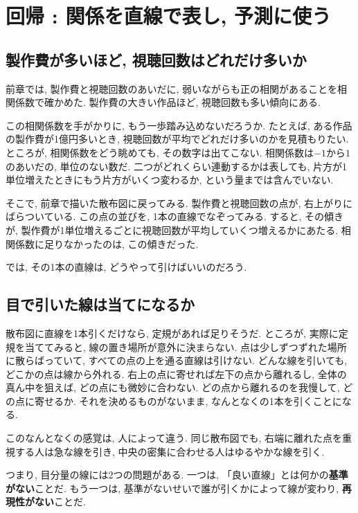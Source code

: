 \section{回帰 : 関係を直線で表し, 予測に使う}

\subsection{製作費が多いほど, 視聴回数はどれだけ多いか}

前章では, 製作費と視聴回数のあいだに, 弱いながらも正の相関があることを相関係数で確かめた.
製作費の大きい作品ほど, 視聴回数も多い傾向にある.

この相関係数を手がかりに, もう一歩踏み込めないだろうか.
たとえば, ある作品の製作費が1億円多いとき, 視聴回数が平均でどれだけ多いのかを見積もりたい.
ところが, 相関係数をどう眺めても, その数字は出てこない.
相関係数は$-1$から$1$のあいだの, 単位のない数だ.
二つがどれくらい連動するかは表しても, 片方が1単位増えたときにもう片方がいくつ変わるか, という量までは含んでいない.

そこで, 前章で描いた散布図に戻ってみる.
製作費と視聴回数の点が, 右上がりにばらついている.
この点の並びを, 1本の直線でなぞってみる.
すると, その傾きが, 製作費が1単位増えるごとに視聴回数が平均していくつ増えるかにあたる.
相関係数に足りなかったのは, この傾きだった.

では, その1本の直線は, どうやって引けばいいのだろう.


\subsection{目で引いた線は当てになるか}

散布図に直線を1本引くだけなら, 定規があれば足りそうだ.
ところが, 実際に定規を当ててみると, 線の置き場所が意外に決まらない.
点は少しずつずれた場所に散らばっていて, すべての点の上を通る直線は引けない.
どんな線を引いても, どこかの点は線から外れる.
右上の点に寄せれば左下の点から離れるし, 全体の真ん中を狙えば, どの点にも微妙に合わない.
どの点から離れるのを我慢して, どの点に寄せるか.
それを決めるものがないまま, なんとなくの1本を引くことになる.

このなんとなくの感覚は, 人によって違う.
同じ散布図でも, 右端に離れた点を重視する人は急な線を引き, 中央の密集に合わせる人はゆるやかな線を引く.

つまり, 目分量の線には2つの問題がある.
一つは, 「良い直線」とは何かの\textbf{基準がない}ことだ.
もう一つは, 基準がないせいで誰が引くかによって線が変わり, \textbf{再現性がない}ことだ.

